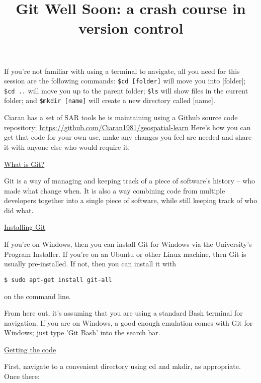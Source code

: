 \documentclass[11pt, a4paper, english]{article}
\newenvironment{wrapbox}
	{
		\begin{tcolorbox}
	}
	{
		\end{tcolorbox}
	}
\begin{document}
\title{Git Well Soon: a crash course in version control}

\maketitle

\begin{wrapbox}
If you're not familiar with using a terminal to navigate, all you need for this session are the following commands: \verb|$cd [folder]| will move you into [folder]; \verb|$cd ..| will move you up to the parent folder; \verb|$ls| will show files in the current folder; and \verb|$mkdir [name]| will create a new directory called [name].
\end{wrapbox}

Ciaran has a set of SAR tools he is maintaining using a Github source code repository; \url{https://github.com/Ciaran1981/geospatial-learn} Here's how you can get that code for your own use, make any changes you feel are needed and share it with anyone else who would require it.

\underline{What is Git?}

Git is a way of managing and keeping track of a piece of software's history -- who made what change when. It is also a way combining code from multiple developers together into a single piece of software, while still keeping track of who did what.



\underline{Installing Git}

If you're on Windows, then you can install Git for Windows via the University's Program Installer. If you're on an Ubuntu or other Linux machine, then Git is usually pre-installed. If not, then you can install it with

\begin{verbatim}
$ sudo apt-get install git-all
\end{verbatim}

on the command line.

\begin{wrapbox}
From here out, it's assuming that you are using a standard Bash terminal for navigation. If you are on Windows, a good enough emulation comes with Git for Windows; just type 'Git Bash' into the search bar.
\end{wrapbox}

\underline{Getting the code}

First, navigate to a convenient directory using cd and mkdir, as appropriate. Once there:
\end{document}
